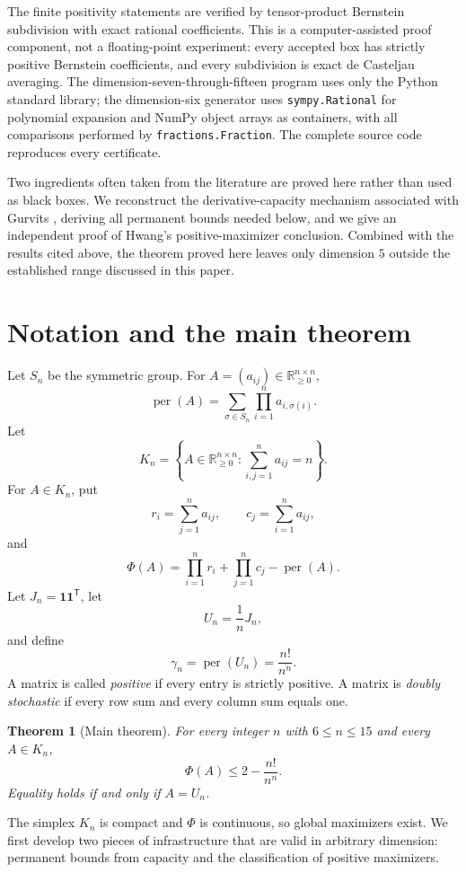 \documentclass[11pt]{article}
\newtheorem{theorem}{Theorem}[section]
\theoremstyle{definition}
\newcommand{\per}{\operatorname{per}}
\newcommand{\Rge}{\mathbb{R}_{\ge 0}}
\newcommand{\1}{\mathbf{1}}
\begin{document}
The finite positivity statements are verified by tensor-product Bernstein
subdivision with exact rational coefficients.  This is a computer-assisted
proof component, not a floating-point experiment: every accepted box has
strictly positive Bernstein coefficients, and every subdivision is exact de
Casteljau averaging.  The dimension-seven-through-fifteen program uses only
the Python standard library; the dimension-six generator uses
\texttt{sympy.Rational} for polynomial expansion and NumPy object arrays as
containers, with all comparisons performed by \texttt{fractions.Fraction}.
The complete source code reproduces every certificate.

Two ingredients often taken from the literature are proved here rather than
used as black boxes.  We reconstruct the derivative-capacity mechanism
associated with Gurvits \cite{Gurvits2008}, deriving all permanent bounds
needed below, and we give an independent proof of Hwang's positive-maximizer
conclusion.  Combined with the results cited above, the theorem proved here
leaves only dimension $5$ outside the established range discussed in this
paper.

\section{Notation and the main theorem}

Let $S_n$ be the symmetric group.  For $A=(a_{ij})\in\Rge^{n\times n}$,
\[
 \per(A)=\sum_{\sigma\in S_n}\prod_{i=1}^n a_{i,\sigma(i)}.
\]
Let
\[
 K_n=\left\{A\in\Rge^{n\times n}:\sum_{i,j=1}^n a_{ij}=n\right\}.
\]
For $A\in K_n$, put
\[
 r_i=\sum_{j=1}^n a_{ij},\qquad c_j=\sum_{i=1}^n a_{ij},
\]
and
\[
 \Phi(A)=\prod_{i=1}^n r_i+\prod_{j=1}^n c_j-\per(A).
\]
Let $J_n=\1\1^{\mathsf T}$, let
\[
 U_n=\frac1nJ_n,
\]
and define
\[
 \gamma_n=\per(U_n)=\frac{n!}{n^n}.
\]
A matrix is called \emph{positive} if every entry is strictly positive.  A matrix is \emph{doubly stochastic} if every row sum and every column sum equals one.

\begin{theorem}[Main theorem]\label{thm:main}
For every integer $n$ with $6\le n\le15$ and every $A\in K_n$,
\[
 \Phi(A)\le 2-\frac{n!}{n^n}.
\]
Equality holds if and only if $A=U_n$.
\end{theorem}

The simplex $K_n$ is compact and $\Phi$ is continuous, so global maximizers exist.  We first develop two pieces of infrastructure that are valid in arbitrary dimension: permanent bounds from capacity and the classification of positive maximizers.
\end{document}
